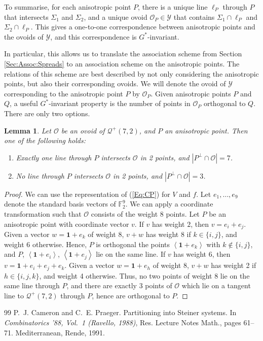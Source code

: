 \documentclass[10pt,a4paper]{amsart}
\newtheorem{lm}[thm]{Lemma}
\newcommand{\FF}{\mathbb F}
\newcommand{\vspan}[1]{\left \langle #1 \right \rangle}
\newcommand{\one}{\mathbf 1}
\newcommand{\mo}{\mathcal O}
\newcommand{\mq}{\mathcal Q}
\newcommand{\my}{\mathcal Y}
\begin{document}
To summarise, for each anisotropic point $P$, there is a unique line $\ell_P$ through $P$ that intersects $\Sigma_1$ and $\Sigma_2$, and a unique ovoid $\mo_P \in \my$ that contains $\Sigma_1 \cap \ell_P$ and $\Sigma_2 \cap \ell_P$.
This gives a one-to-one correspondence between anisotropic points and the ovoids of $\my$, and this correspondence is $G^*$-invariant.

In particular, this allows us to translate the association scheme from Section \ref{Sec:Assoc:Spreads} to an association scheme on the anisotropic points.
The relations of this scheme are best described by not only considering the anisotropic points, but also their corresponding ovoids.
We will denote the ovoid of $\my$ corresponding to the anisotropic point $P$ by $\mo_P$.
Given anisotropic points $P$ and $Q$, a useful $G^*$-invariant property is the number of points in $\mo_P$ orthogonal to $Q$.
There are only two options.


\begin{lm}
 Let $\mo$ be an ovoid of $\mq^+(7,2)$, and $P$ an anisotropic point.
 Then one of the following holds:
 \begin{enumerate}
  \item Exactly one line through $P$ intersects $\mo$ in 2 points, and $|P^\perp \cap \mo| = 7$.
  \item No line through $P$ intersects $\mo$ in 2 points, and $|P^\perp \cap \mo| = 3$.
 \end{enumerate}
\end{lm}

\begin{proof}
 We can use the representation of (\ref{Eq:CP}) for $V$ and $f$.
 Let $e_1, \dots, e_9$ denote the standard basis vectors of $\FF_2^9$.
 We can apply a coordinate transformation such that $\mo$ consists of the weight 8 points.
 Let $P$ be an anisotropic point with coordinate vector $v$.
 If $v$ has weight $2$, then $v = e_i + e_j$.
 Given a vector $w = \one + e_k$ of weight $8$, $v+w$ has weight $8$ if $k \in \{i,j\}$, and weight $6$ otherwise.
 Hence, $P$ is orthogonal the points $\vspan{\one + e_k}$ with $k \notin \{i,j\}$, and $P$, $\vspan{\one + e_i}$, $\vspan{\one + e_j}$ lie on the same line.
 If $v$ has weight $6$, then $v = \one + e_i + e_j + e_k$.
 Given a vector $w = \one + e_h$ of weight 8, $v+w$ has weight 2 if $h \in \{i,j,k\}$, and weight 4 otherwise.
 Thus, no two points of weight 8 lie on the same line through $P$, and there are exactly 3 points of $\mo$ which lie on a tangent line to $\mq^+(7,2)$ through $P$, hence are orthogonal to $P$.
\end{proof}


\begin{thebibliography}{99}
 P.~J. Cameron and C.~E. Praeger. \newblock Partitioning into {S}teiner systems. \newblock In {\em Combinatorics '88, {V}ol.\ 1 ({R}avello, 1988)}, Res. Lecture Notes Math., pages 61--71. Mediterranean, Rende, 1991.
\end{thebibliography}
\end{document}
